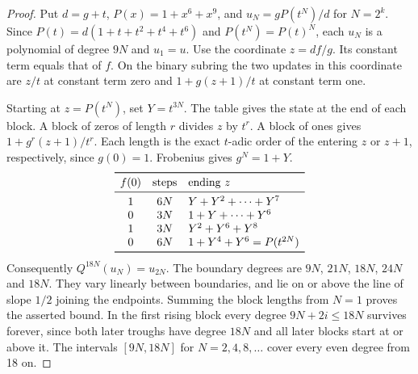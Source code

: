 \documentclass[11pt,a4paper]{article}
\begin{document}
\begin{proof}
Put $d=g+t$, $P(x)=1+x^6+x^9$, and $u_N=gP(t^N)/d$ for $N=2^k$.
Since $P(t)=d(1+t+t^2+t^4+t^6)$ and $P(t^N)=P(t)^N$, each $u_N$ is a polynomial of degree $9N$ and $u_1=u$.
Use the coordinate $z=df/g$. Its constant term equals that of $f$. On the binary subring the two updates in this coordinate are $z/t$ at constant term zero and $1+g(z+1)/t$ at constant term one.

Starting at $z=P(t^N)$, set $Y=t^{3N}$. The table gives the state at the end of each block. A block of zeros of length $r$ divides $z$ by $t^r$. A block of ones gives $1+g^r(z+1)/t^r$. Each length is the exact $t$-adic order of the entering $z$ or $z+1$, respectively, since $g(0)=1$. Frobenius gives $g^N=1+Y$.
\[
\begin{array}{ccl}
\toprule
 f(0)&\text{steps}&\text{ending }z\\\midrule
 1&6N&Y+Y^2+\cdots+Y^7\\
 0&3N&1+Y+\cdots+Y^6\\
 1&3N&Y^2+Y^6+Y^8\\
 0&6N&1+Y^4+Y^6=P(t^{2N})\\\bottomrule
\end{array}
\]
Consequently $Q^{18N}(u_N)=u_{2N}$. The boundary degrees are $9N$, $21N$, $18N$, $24N$ and $18N$. They vary linearly between boundaries, and lie on or above the line of slope $1/2$ joining the endpoints. Summing the block lengths from $N=1$ proves the asserted bound. In the first rising block every degree $9N+2i\le18N$ survives forever, since both later troughs have degree $18N$ and all later blocks start at or above it. The intervals $[9N,18N]$ for $N=2,4,8,\ldots$ cover every even degree from 18 on.
\end{proof}
\newpage
\end{document}
